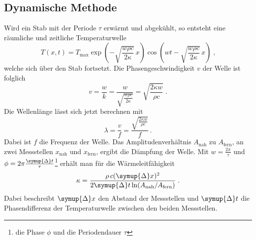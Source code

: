 \subsection{Dynamische Methode}
\label{sec:dyM}
Wird ein Stab mit der Periode $\tau$ erwärmt und abgekühlt, so entsteht eine räumliche und zeitliche Temperaturwelle
\begin{equation}
    T(x,t)=T_\text{max} \exp \left({-\sqrt{\frac{w \rho c}{2 \kappa}}}\, x \right)\cos \left( wt-\sqrt{\frac{w \rho c}{2 \kappa}}\, x\right)\; \text{,}
\end{equation}
welche sich über den Stab fortsetzt. Die Phasengeschwindigkeit $v$ der Welle ist folglich
\begin{equation}
    v=\frac{w}{k}=\frac{w}{\sqrt{\frac{w \rho c}{2 \kappa}}}=\sqrt{\frac{2\kappa w}{\rho c}}\; \text{.}
\end{equation}
Die Wellenlänge lässt sich jetzt berechnen mit
\begin{equation}
    \lambda= \frac{v}{f}= \frac{\sqrt{\frac{2\kappa w}{\rho c}}}{f} \, \text{.}
    \label{eqn:wellenlänge}
\end{equation}
Dabei ist $f$ die Frequenz der Welle.
Das Amplitudenverhältnis $A_\text{nah}$ zu $A_\text{fern}$, an zwei Messstellen $x_\text{nah}$ und $x_\text{fern}$, ergibt die Dämpfung der Welle.
Mit $w=\frac{2\pi}{\tau}$ und $\phi=2\pi \frac{\symup{\Delta}t}{\tau}$\footnote{die Phase $\phi$ und die Periodendauer $\tau$} erhält man für die Wärmeleitfähigkeit
\begin{equation}
    \kappa=\frac{\rho\, c (\symup{\Delta}x)^2}{2\symup{\Delta}t \ln (A_\text{nah}/A_\text{fern})}\; \text{.}
\end{equation}
Dabei beschreibt $\symup{\Delta}x$ den Abstand der Messstellen und $\symup{\Delta}t$ die Phasendifferenz der Temperaturwelle zwischen den beiden Messstellen.


